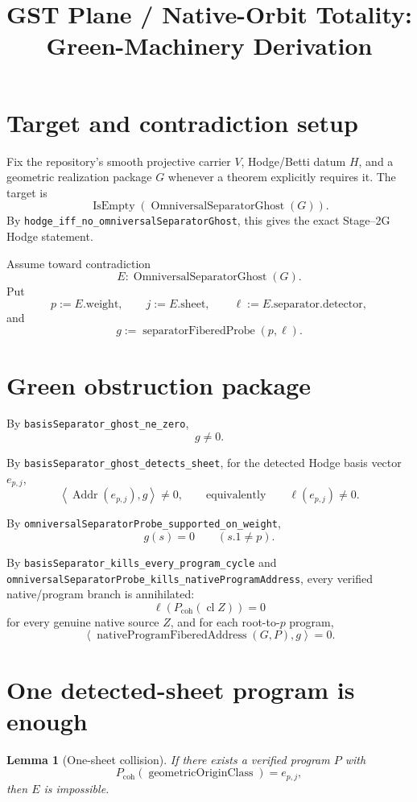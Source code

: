 \documentclass[11pt]{article}
\title{GST Plane / Native-Orbit Totality: Green-Machinery Derivation}
\date{}
\newtheorem{lemma}{Lemma}
\newcommand{\pair}[2]{\left\langle #1,#2\right\rangle}
\begin{document}
\maketitle

\section{Target and contradiction setup}

Fix the repository's smooth projective carrier $V$, Hodge/Betti datum $H$, and
a geometric realization package $G$ whenever a theorem explicitly requires it.
The target is
\[
  \operatorname{IsEmpty}(\operatorname{OmniversalSeparatorGhost}(G)).
\]
By \texttt{hodge\_iff\_no\_omniversalSeparatorGhost}, this gives the exact
Stage--2G Hodge statement.

Assume toward contradiction
\[
 E:\operatorname{OmniversalSeparatorGhost}(G).
\]
Put
\[
 p:=E.\mathrm{weight},\qquad j:=E.\mathrm{sheet},
 \qquad \ell:=E.\mathrm{separator.detector},
\]
and
\[
 g:=\operatorname{separatorFiberedProbe}(p,\ell).
\]

\section{Green obstruction package}

By \texttt{basisSeparator\_ghost\_ne\_zero},
\[
 g\neq0. \tag{G1}
\]

By \texttt{basisSeparator\_ghost\_detects\_sheet},
for the detected Hodge basis vector $e_{p,j}$,
\[
 \pair{\operatorname{Addr}(e_{p,j})}{g}\neq0,
 \qquad\text{equivalently}\qquad \ell(e_{p,j})\neq0. \tag{G2}
\]

By \texttt{omniversalSeparatorProbe\_supported\_on\_weight},
\[
 g(s)=0\qquad(s.1\neq p). \tag{G3}
\]

By \texttt{basisSeparator\_kills\_every\_program\_cycle} and
\texttt{omniversalSeparatorProbe\_kills\_nativeProgramAddress}, every
verified native/program branch is annihilated:
\[
 \ell\!\left(P_{\mathrm{coh}}(\operatorname{cl}Z)\right)=0
\]
for every genuine native source $Z$, and for each root-to-$p$ program,
\[
 \pair{\operatorname{nativeProgramFiberedAddress}(G,P)}{g}=0. \tag{G4}
\]

\section{One detected-sheet program is enough}

\begin{lemma}[One-sheet collision]
If there exists a verified program $P$ with
\[
 P_{\mathrm{coh}}(\operatorname{geometricOriginClass})=e_{p,j}, \tag{1}
\]
then $E$ is impossible.
\end{lemma}
\end{document}
